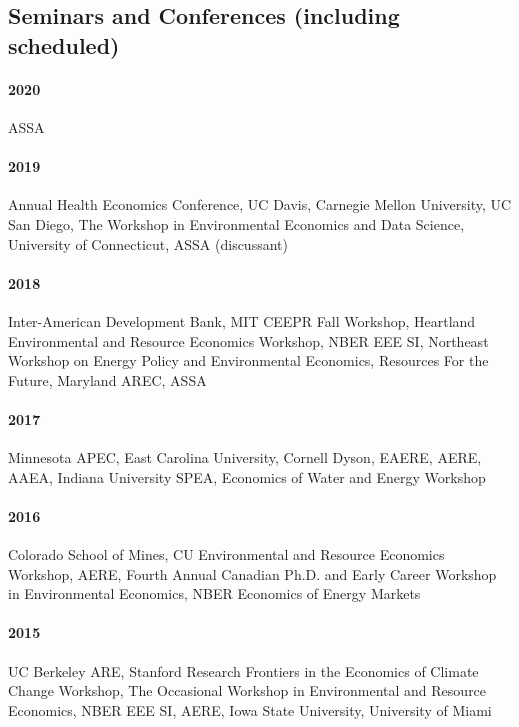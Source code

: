\documentclass{res} %
\begin{document}
\begin{resume}
\section{Seminars and Conferences (including scheduled)}\vspace{-.1in}
\paragraph{2020} ASSA \vspace{-.3in}
\paragraph{2019} Annual Health Economics Conference, UC Davis, Carnegie Mellon University, UC San Diego, The Workshop in Environmental Economics and Data Science, University of Connecticut, ASSA (discussant) \vspace{-.3in}
\paragraph{2018} Inter-American Development Bank, MIT CEEPR Fall Workshop, Heartland Environmental and Resource Economics Workshop, NBER EEE SI, Northeast Workshop on Energy Policy and Environmental Economics, Resources For the Future, Maryland AREC, ASSA \vspace{-.3in}
\paragraph{2017} Minnesota APEC, East Carolina University, Cornell Dyson, EAERE, AERE, AAEA, Indiana University SPEA, Economics of Water and Energy Workshop \vspace{-.3in}
\paragraph{2016} Colorado School of Mines, CU Environmental and Resource Economics Workshop, AERE, Fourth Annual Canadian Ph.D. and Early Career Workshop in Environmental Economics, NBER Economics of Energy Markets \vspace{-.3in}
\paragraph{2015} UC Berkeley ARE, Stanford Research Frontiers in the Economics of Climate Change Workshop, The Occasional Workshop in Environmental and Resource Economics, NBER EEE SI, AERE, Iowa State University, University of Miami \vspace{-.3in}

\end{resume}
\end{document}

